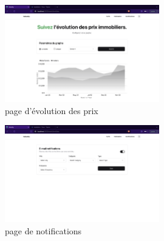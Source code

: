 \documentclass[a4paper,12pt]{report}
\numberwithin{equation}{section}
\begin{document}
\begin{figure}[H]
    \centering
    \includegraphics[width=0.6\textwidth]{screens/estimation2.png}
    \caption{page d'évolution des prix}
    \label{fig:page d'évolution des prix}
\end{figure}
\begin{figure}[H]
    \centering
    \includegraphics[width=0.6\textwidth]{screens/notif.png}
    \caption{page de notifications}
    \label{fig:page de notifications}
\end{figure}
\end{document}
